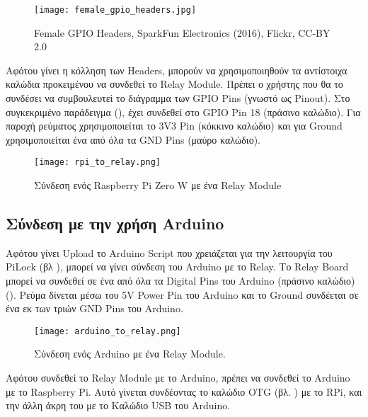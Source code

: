 		\begin{figure}[h]
			\centering
				\texttt{[image: female\_gpio\_headers.jpg]}
			\caption{Female GPIO Headers, SparkFun Electronics (2016), Flickr, CC-BY 2.0}
			\label{fig:headers}
		\end{figure}

		Αφότου γίνει η κόλληση των Headers, μπορούν να χρησιμοποιηθούν τα αντίστοιχα καλώδια προκειμένου να συνδεθεί το Relay Module. Πρέπει ο χρήστης που θα το συνδέσει να συμβουλευτεί το διάγραμμα των GPIO Pins (γνωστό ως Pinout). Στο συγκεκριμένο παράδειγμα (), έχει συνδεθεί στο GPIO Pin 18 (πράσινο καλώδιο). Για παροχή ρεύματος χρησιμοποιείται το 3V3 Pin (κόκκινο καλώδιο) και για Ground χρησιμοποιείται ένα από όλα τα GND Pins (μαύρο καλώδιο).

		\begin{figure}[h]
			\centering
				\texttt{[image: rpi\_to\_relay.png]}
			\caption{Σύνδεση ενός Raspberry Pi Zero W με ένα Relay Module}
			\label{fig:rpi_to_relay}
		\end{figure}


	\subsection{Σύνδεση με την χρήση Arduino}
		\label{subsec:arduino_conn}
		Αφότου γίνει Upload το Arduino Script που χρειάζεται για την λειτουργία του PiLock (βλ ), μπορεί να γίνει σύνδεση του Arduino με το Relay. Το Relay Board μπορεί να συνδεθεί σε ένα από όλα τα Digital Pins του Arduino (πράσινο καλώδιο) (). Ρεύμα δίνεται μέσω του 5V Power Pin του Arduino και το Ground συνδέεται σε ένα εκ των τριών GND Pins του Arduino.

		\begin{figure}[h]
			\centering
				\texttt{[image: arduino\_to\_relay.png]}
			\caption{Σύνδεση ενός Arduino με ένα Relay Module.}
			\label{fig:arduino_to_relay}
		\end{figure}

		Αφότου συνδεθεί το Relay Module με το Arduino, πρέπει να συνδεθεί το Arduino με το Raspberry Pi. Αυτό γίνεται συνδέοντας το καλώδιο OTG (βλ. ) με το RPi, και την άλλη άκρη του με το Καλώδιο USB του Arduino.